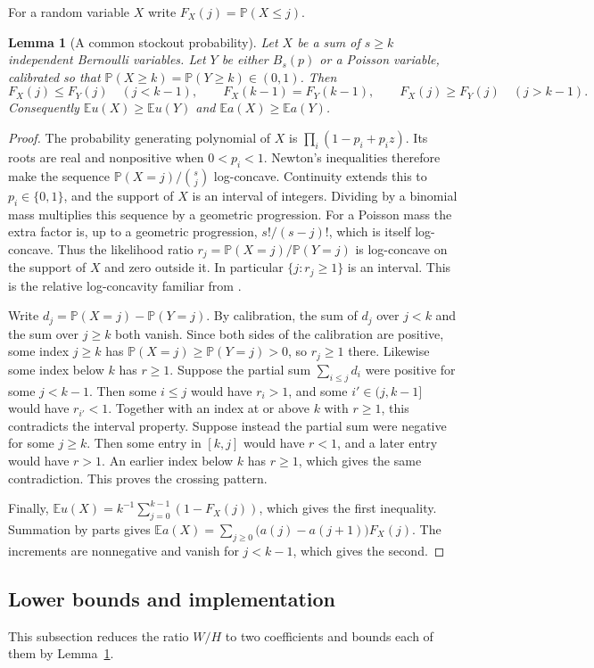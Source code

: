 \documentclass[11pt,a4paper]{article}
\newtheorem{lem}[thm]{Lemma}
\theoremstyle{remark}
\newcommand{\E}{\mathbb E}
\newcommand{\Prob}{\mathbb P}
\begin{document}
For a random variable $X$ write $F_X(j)=\Prob(X\le j)$.
\begin{lem}[A common stockout probability]\label{lem:cross}
Let $X$ be a sum of $s\ge k$ independent Bernoulli variables. Let $Y$ be either $B_s(p)$ or a Poisson variable, calibrated so that $\Prob(X\ge k)=\Prob(Y\ge k)\in(0,1)$. Then
\[
 F_X(j)\le F_Y(j)\quad (j<k-1),\qquad
 F_X(k-1)=F_Y(k-1),\qquad F_X(j)\ge F_Y(j)\quad(j>k-1).
\]
Consequently $\E u(X)\ge\E u(Y)$ and $\E a(X)\ge\E a(Y)$.
\end{lem}
\begin{proof}
The probability generating polynomial of $X$ is $\prod_i(1-p_i+p_i z)$. Its roots are real and nonpositive when $0<p_i<1$. Newton's inequalities therefore make the sequence $\Prob(X=j)/\binom{s}{j}$ log-concave. Continuity extends this to $p_i\in\{0,1\}$, and the support of $X$ is an interval of integers. Dividing by a binomial mass multiplies this sequence by a geometric progression. For a Poisson mass the extra factor is, up to a geometric progression, $s!/(s-j)!$, which is itself log-concave. Thus the likelihood ratio $r_j=\Prob(X=j)/\Prob(Y=j)$ is log-concave on the support of $X$ and zero outside it. In particular $\{j:r_j\ge1\}$ is an interval. This is the relative log-concavity familiar from \cite{yu}.

Write $d_j=\Prob(X=j)-\Prob(Y=j)$. By calibration, the sum of $d_j$ over $j<k$ and the sum over $j\ge k$ both vanish. Since both sides of the calibration are positive, some index $j\ge k$ has $\Prob(X=j)\ge\Prob(Y=j)>0$, so $r_j\ge1$ there. Likewise some index below $k$ has $r\ge1$. Suppose the partial sum $\sum_{i\le j}d_i$ were positive for some $j<k-1$. Then some $i\le j$ would have $r_i>1$, and some $i'\in(j,k-1]$ would have $r_{i'}<1$. Together with an index at or above $k$ with $r\ge1$, this contradicts the interval property. Suppose instead the partial sum were negative for some $j\ge k$. Then some entry in $[k,j]$ would have $r<1$, and a later entry would have $r>1$. An earlier index below $k$ has $r\ge1$, which gives the same contradiction. This proves the crossing pattern.

Finally, $\E u(X)=k^{-1}\sum_{j=0}^{k-1}(1-F_X(j))$, which gives the first inequality. Summation by parts gives $\E a(X)=\sum_{j\ge0}\big(a(j)-a(j+1)\big)F_X(j)$. The increments are nonnegative and vanish for $j<k-1$, which gives the second.
\end{proof}

\subsection{Lower bounds and implementation}
This subsection reduces the ratio $W/H$ to two coefficients and bounds each of them by Lemma~\ref{lem:cross}.
\end{document}
